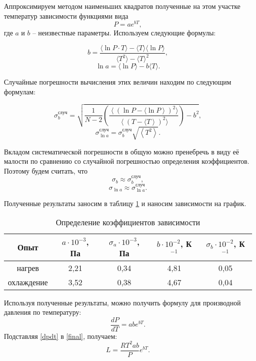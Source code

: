 \documentclass[a4paper,12pt]{article} %
\begin{document}
Аппроксимируем методом наименьших квадратов полученные на этом участке температур зависимости функциями вида \[ P=ae^{bT}, \] где $ a $ и $ b $ -- неизвестные параметры. Используем следующие формулы:

\[ b = \frac{\langle \ln P \cdot T \rangle - \langle T \rangle \langle \ln P \rangle}{\langle T^2 \rangle - \langle T \rangle ^2},\]
\[ \ln a = \langle \ln P \rangle - b\langle T \rangle. \]

Случайные погрешности вычисления этих величин находим по следующим формулам:

\[ \sigma^\text{случ}_b = \sqrt{\frac{1}{N-2} \left(\frac{\left\langle\left(\ln P - \langle \ln P\right\rangle\right)^2 \rangle}{\left\langle\left(T - \langle T\right\rangle\right)^2 \rangle}\right)-b^2},\]
\[ \sigma^\text{случ}_{\ln a}=\sigma^\text{случ}_b\sqrt{\left\langle T^2 \right\rangle}. \]

\label{mnk}

Вкладом систематической погрешности в общую можно пренебречь в виду её малости по сравнению со случайной погрешностью определения коэффициентов. Поэтому будем считать, что \[ \sigma_b \approx \sigma^\text{случ}_b, \] \[ \sigma_{\ln a} \approx \sigma^\text{случ}_{\ln a}. \]

Полученные результаты заносим в таблицу \ref{tab:ab} и наносим зависимости на график.

\begin{table}[H]
	\centering
	\begin{tabular}{|c|c|c|c|c|}
		\hline
		Опыт & $ a \cdot 10^{-3}$, Па & $ \sigma_a \cdot 10^{-3}$, Па & $ b \cdot 10^{-2} $, К$ ^{-1} $ & $ \sigma_b \cdot 10^{-2} $, К$ ^{-1} $ \\ \hline
		нагрев & 2,21 & 0,34 & 4,81 & 0,05 \\ \hline
		охлаждение & 3,52 & 0,38 & 4,67 & 0,04 \\ \hline
	\end{tabular}
	\caption{Определение коэффициентов зависимости}
	\label{tab:ab}
\end{table}

Используя полученные результаты, можно получить формулу для производной давления по температуру: 
\begin{equation}\label{dpdt}
\frac{dP}{dT} = abe^{bT}.
\end{equation}
Подставляя \eqref{dpdt} в \eqref{final}, получаем:
\begin{equation}\label{newFinal}
L=\frac{RT^2ab}{P}e^{bT}.
\end{equation}
\end{document}
